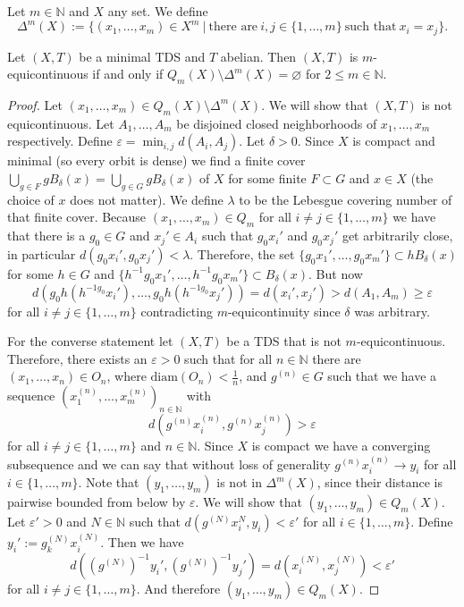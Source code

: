 \begin{definition}
Let $m \in \mathbb{N}$ and $X$ any set.
	We define
	\begin{equation*}
	\Delta^m(X) := \{ (x_1, \dots, x_m) \in X^m \ | \ \text{there are} \ i, j \in \{1, \dots, m\} \ \text{such that} \ x_i = x_j \}.
	\end{equation*}
\end{definition}

\begin{theorem}
	Let $(X, T)$ be a minimal TDS and $T$ abelian.
	Then $(X, T)$ is $m$-equicontinuous if and only if $Q_m(X) \setminus \Delta^m(X) = \varnothing$ for $2 \leq m \in \mathbb{N}$.
\end{theorem}
\begin{proof}
	Let $(x_1, \dots, x_m) \in Q_m(X) \setminus \Delta^m(X)$.
	We will show that $(X, T)$ is not equicontinuous.
	Let $A_1, \dots, A_m$ be disjoined closed neighborhoods of $x_1, \dots, x_m$ respectively.
	Define $\varepsilon = \min_{i, j} d(A_i, A_j)$.
	Let $\delta > 0$.
	Since $X$ is compact and minimal (so every orbit is dense) we find a finite cover $\bigcup_{g \in F} gB_\delta(x) = \bigcup_{g \in G} gB_\delta(x)$ of $X$ for some finite $F \subset G$ and $x \in X$ (the choice of $x$ does not matter).
	We define $\lambda$ to be the Lebesgue covering number of that finite cover.
	Because $(x_1, \dots, x_m) \in Q_m$ for all $i \neq j \in \{1, \dots, m\}$ we have that there is a $g_0 \in G$ and $x_j' \in A_i$ such that $g_0x_i'$ and $g_0 x_j'$ get arbitrarily close, in particular $d(g_0 x_i', g_0 x_j') < \lambda$.
	Therefore, the set $\{ g_0x_1', \dots, g_0x_m' \} \subset hB_\delta(x)$ for some $h \in G$ and $\{ h^{-1}g_0x_1', \dots, h^{-1}g_0x_m' \} \subset B_\delta(x)$.
	But now
	\[ d(g_0h(h^{-1g_0}x_i'), \dots, g_0h(h^{-1g_0}x_j')) = d(x_i', x_j') > d(A_1, A_m) \geq \varepsilon \]
	for all $i \neq j \in \{1, \dots, m\}$ contradicting $m$-equicontinuity since $\delta$ was arbitrary.

	For the converse statement let $(X, T)$ be a TDS that is not $m$-equicontinuous.
	Therefore, there exists an $\varepsilon > 0$ such that for all $n \in \mathbb{N}$ there are $(x_1, \dots, x_n) \in O_{n}$,
	where $\text{diam}(O_n) < \frac{1}{n}$, and $g^{(n)} \in G$ such that
	we have a sequence $(x_1^{(n)}, \dots, x_m^{(n)})_{n \in \mathbb{N}}$ with
	\[ d(g^{(n)}x_i^{(n)}, g^{(n)}x_j^{(n)}) > \varepsilon \]
 	for all $i \neq j \in \{1, \dots, m\}$ and $n \in \mathbb{N}$.
	Since $X$ is compact we have a converging subsequence and we can say that without loss of generality $g^{(n)}x_i^{(n)} \to y_i$ for all $i \in \{1, \dots, m\}$.
	Note that $(y_1, \dots, y_m)$ is not in $\Delta^m(X)$, since their distance is pairwise bounded from below by $\varepsilon$.
	We will show that $(y_1, \dots, y_m) \in Q_m(X)$.
	Let $\varepsilon' > 0$ and $N \in \mathbb{N}$ such that $d(g^{(N)}x_i^{N}, y_i) < \varepsilon'$ for all $i \in \{1, \dots, m\}$.
	Define $y_i' := g_k^{(N)} x_i^{(N)}$.
	Then we have
	\[ d((g^{(N)})^{-1} y_i', (g^{(N)})^{-1} y_j') = d(x_i^{(N)}, x_j^{(N)}) < \varepsilon' \]
	for all $i \neq j \in \{1, \dots, m\}$.
	And therefore $(y_1, \dots, y_m) \in Q_m(X)$.


\end{proof}

